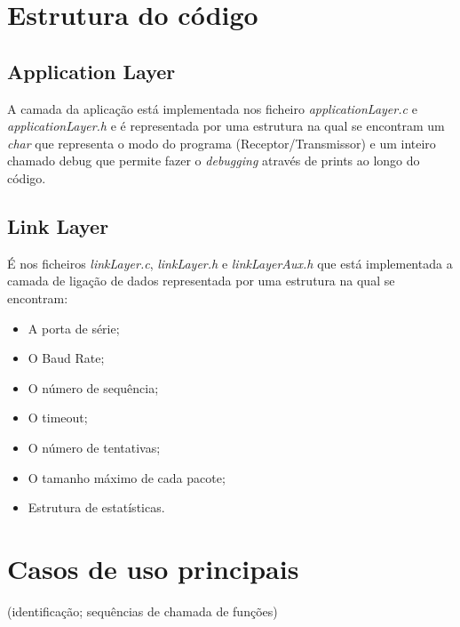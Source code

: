 \documentclass[11pt]{article}
\begin{document}
\section{Estrutura do código}

\subsection{Application Layer}
 
  A camada da aplicação está implementada nos ficheiro \textit{applicationLayer.c} e \textit{applicationLayer.h} e é representada por uma estrutura na qual se encontram um \textit{char} que representa o modo do programa (Receptor/Transmissor) e um inteiro chamado debug que permite fazer o \textit{debugging} através de prints ao longo do código.
 
\small

\normalsize

\subsection{Link Layer}
 
 É nos ficheiros \textit{linkLayer.c}, \textit{linkLayer.h} e \textit{linkLayerAux.h} que está implementada a camada de ligação de dados representada por uma estrutura na qual se encontram:

\begin{itemize}
  \item A porta de série;
   \item O Baud Rate;
   \item O número de sequência;
   \item O timeout;
   \item O número de tentativas;
   \item O tamanho máximo de cada pacote;
   \item Estrutura de estatísticas.
\end{itemize}

\small

\normalsize

\section{Casos de uso principais}

 (identificação; sequências de chamada de funções)


\newpage
\end{document}
